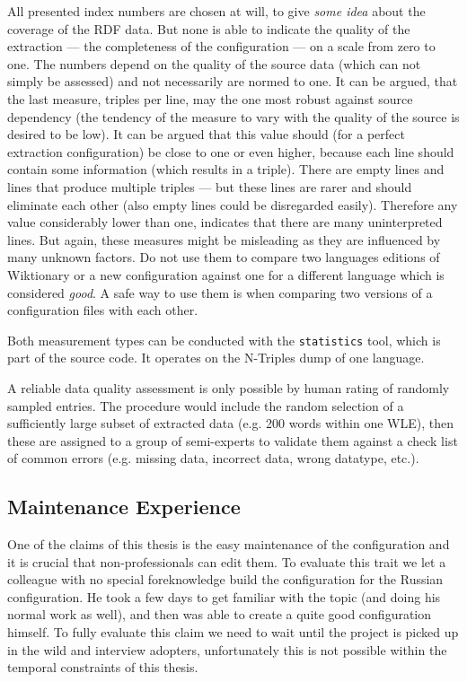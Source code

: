 All presented index numbers are chosen at will, to give \textit{some idea} about the coverage of the RDF data.
But none is able to indicate the quality of the extraction --- the completeness of the configuration --- on a scale from zero to one. 
The numbers depend on the quality of the source data (which can not simply be assessed) and not necessarily are normed to one.
It can be argued, that the last measure, triples per line, may the one most robust against source dependency (the tendency of the measure to vary with the quality of the source is desired to be low). 
It can be argued that this value should (for a perfect extraction configuration) be close to one or even higher, because each line should contain some information (which results in a triple). 
There are empty lines and lines that produce multiple triples --- but these lines are rarer and should eliminate each other (also empty lines could be disregarded easily). 
Therefore any value considerably lower than one, indicates that there are many uninterpreted lines. 
But again, these measures might be misleading as they are influenced by many unknown factors. 
Do not use them to compare two languages editions of Wiktionary or a new configuration against one for a different language which is considered \textit{good}.
A safe way to use them is when comparing two versions of a configuration files with each other.

Both measurement types can be conducted with the \texttt{statistics} tool, which is part of the source code. 
It operates on the N-Triples dump of one language. 

A reliable data quality assessment is only possible by human rating of randomly sampled entries. 
The procedure would include the random selection of a sufficiently large subset of extracted data (e.g. 200 words within one WLE), then these are assigned to a group of semi-experts to validate them against a check list of common errors (e.g. missing data, incorrect data, wrong datatype, etc.).

\subsection{Maintenance Experience}
One of the claims of this thesis is the easy maintenance of the configuration and it is crucial that non-professionals can edit them. 
To evaluate this trait we let a colleague with no special foreknowledge build the configuration for the Russian configuration. 
He took a few days to get familiar with the topic (and doing his normal work as well), and then was able to create a quite good configuration himself. 
To fully evaluate this claim we need to wait until the project is picked up in the wild and interview adopters, unfortunately this is not possible within the temporal constraints of this thesis.

